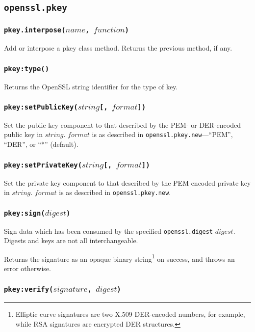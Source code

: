 \documentclass[11pt, oneside]{memoir}
\newcommand*{\fn}[1]{\texttt{#1}\xspace}
\newcommand*{\module}[1]{\texttt{#1}\xspace}
\newcounter{toccols}
\newenvironment{Module}[1]{
	\subsection{\texttt{#1}}
	\addtocontents{toc}{
		\protect\begin{multicols}{\value{toccols}}
	}
}{
	\addtocontents{toc}{\protect\end{multicols}}
}
\begin{document}
\begin{Module}{openssl.pkey}
\subsubsection[\fn{pkey.interpose}]{\fn{pkey.interpose($name$, $function$)}}

Add or interpose a pkey class method. Returns the previous method, if any.

\subsubsection[\fn{pkey:type}]{\fn{pkey:type()}}

Returns the OpenSSL string identifier for the type of key.

\subsubsection[\fn{pkey:setPublicKey}]{\fn{pkey:setPublicKey($string$[, $format$])}}

Set the public key component to that described by the PEM- or DER-encoded public key in $string$. $format$ is as described in \fn{openssl.pkey.new}---``PEM'', ``DER'', or ``*'' (default).

\subsubsection[\fn{pkey:setPrivateKey}]{\fn{pkey:setPrivateKey($string$[, $format$])}}

Set the private key component to that described by the PEM encoded private key in $string$. $format$ is as described in \fn{openssl.pkey.new}.

\subsubsection[\fn{pkey:sign}]{\fn{pkey:sign($digest$)}}

Sign data which has been consumed by the specified \module{openssl.digest} $digest$. Digests and keys are not all interchangeable.

Returns the signature as an opaque binary string\footnote{Elliptic curve signatures are two X.509 DER-encoded numbers, for example, while RSA signatures are encrypted DER structures.} on success, and throws an error otherwise.

\subsubsection[\fn{pkey:verify}]{\fn{pkey:verify($signature$, $digest$)}}


\end{Module}
\end{document}
